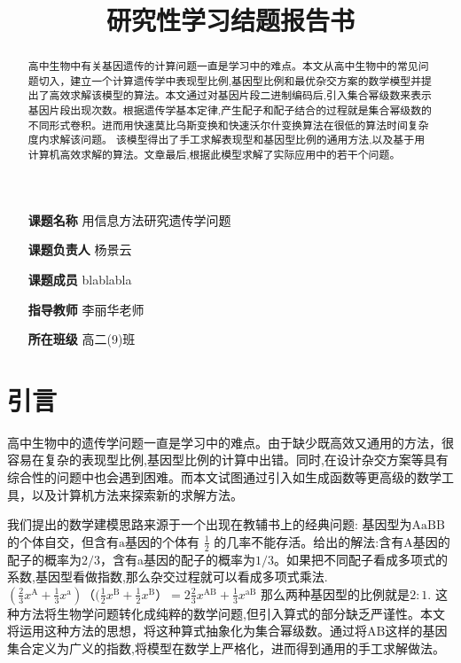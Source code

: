 \documentclass{article}
\title{研究性学习结题报告书}
\author{}
\begin{document}
\maketitle

\begin{itemize}
    \item[\textbf{课题名称}] 用信息方法研究遗传学问题 \centering
    \item[\textbf{课题负责人}] 杨景云
    \item[\textbf{课题成员}] blablabla
    \item[\textbf{指导教师}] 李丽华老师
    \item[\textbf{所在班级}] 高二(9)班
\end{itemize}

\begin{abstract}
    高中生物中有关基因遗传的计算问题一直是学习中的难点。本文从高中生物中的常见问题切入，建立一个计算遗传学中表现型比例,基因型比例和最优杂交方案的数学模型并提出了高效求解该模型的算法。本文通过对基因片段二进制编码后,引入集合幂级数来表示基因片段出现次数。根据遗传学基本定律,产生配子和配子结合的过程就是集合幂级数的不同形式卷积。进而用快速莫比乌斯变换和快速沃尔什变换算法在很低的算法时间复杂度内求解该问题。
     该模型得出了手工求解表现型和基因型比例的通用方法,以及基于用计算机高效求解的算法。文章最后,根据此模型求解了实际应用中的若干个问题。
\end{abstract}

\newpage

\tableofcontents %

\newpage

\section{引言}

高中生物中的遗传学问题一直是学习中的难点。由于缺少既高效又通用的方法，很容易在复杂的表现型比例,基因型比例的计算中出错。同时,在设计杂交方案等具有综合性的问题中也会遇到困难。而本文试图通过引入如生成函数等更高级的数学工具，以及计算机方法来探索新的求解方法。

我们提出的数学建模思路来源于一个出现在教辅书上的经典问题\cite{蔡雪燕2009浅谈高中生物概念教学}: 基因型为$\text{AaBB}$的个体自交，但含有$\text{a}$基因的个体有 $\frac{1}{2} $ 的几率不能存活。给出的解法\cite{张克芳2013浅析高中生物遗传学习题的解析技巧}:含有A基因的配子的概率为$2/3$，含有a基因的配子的概率为$1/3$。如果把不同配子看成多项式的系数,基因型看做指数,那么杂交过程就可以看成多项式乘法. 
$(\frac{2}{3}x^{\text{A}}+\frac{1}{3} x^{\text{a}})（(\frac{1}{2}x^{\text{B}}+\frac{1}{2}x^{\text{B}}）=2\frac{2}{3}x^{\text{AB}}+\frac{1}{3}x^{\text{aB}}$ 那么两种基因型的比例就是$2:1$. 这种方法将生物学问题转化成纯粹的数学问题,但引入算式的部分缺乏严谨性。本文将运用这种方法的思想，将这种算式抽象化为集合幂级数。通过将$\text{AB}$这样的基因集合定义为广义的指数,将模型在数学上严格化，进而得到通用的手工求解做法。
\end{document}
